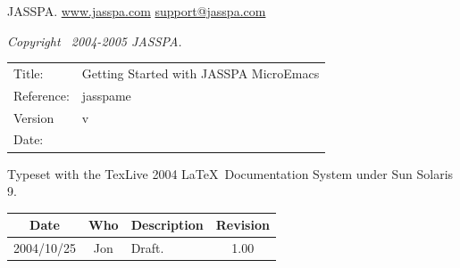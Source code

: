 \documentclass[11pt,a4paper,pdftex]{article}
\newcommand{\docTitle}{Getting Started with JASSPA MicroEmacs}
\newcommand{\docDate}{\CVSDate}
\newcommand{\docVersion}{\CVSRevision}
\newcommand{\docReference}{jasspame}
\newcommand{\tableTitle}[1]{\textbf{#1}}%
\begin{document}
\newpage
\setlength{\parindent}{0pt}
\setlength{\parskip}{0.5ex}
\pagestyle{fancy}

\begin{small}
\vspace{.5in}
JASSPA.
\href{http://www.jasspa.com}{www.jasspa.com}\newline
\href{mailto:support@jasspa.com}{support@jasspa.com}\newline

\vspace{0.5in}

\textit{Copyright \textcopyright\ 2004-2005 JASSPA.}


\vspace{0.5in}

\begin{table}[ht]
  \begin{tabular}{ll}
    Title:        & \docTitle \\
    Reference:    & \docReference \\
    Version       & v\docVersion \\
    Date:         & \docDate \\
  \end{tabular}
\end{table}

Typeset with the TexLive 2004 \LaTeX\ Documentation System under Sun Solaris
9.

\vspace{0.5in}

\begin{center}
  \begin{table}[ht]
    \begin{tabular}{|c|c|p{4in}|c|}
    \hline
    \tableTitle{Date} & \tableTitle{Who} & \tableTitle{Description} & \tableTitle{Revision} \\
    \hline
    2004/10/25 & Jon & Draft. & 1.00 \\ \hline
    \end{tabular}
  \end{table}
\end{center}
\end{small}
\end{document}
